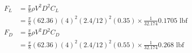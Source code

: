 \begin{align*}
    F_L &= \frac{\pi}{8} \rho V^2 D^2 C_L \\
        &= \frac{\pi}{8} (62.36) (4)^2 (2.4/12)^2 (0.35) \times \frac{1}{32.174}
        \boxed{0.1705 \text{ lbf}} \\
    F_D &= \frac{\pi}{8} \rho V^2 D^2 C_D \\
        &= \frac{\pi}{8} (62.36) (4)^2 (2.4/12)^2 (0.55) \times \frac{1}{32.174}
        \boxed{0.268 \text{ lbf}}
\end{align*}